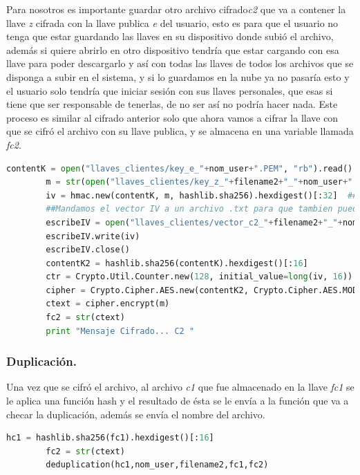 Para nosotros es importante guardar otro archivo cifrado\textit{c2} que va a contener la llave \textit{z} cifrada con la llave publica \textit{e} del usuario, esto es para que el usuario no tenga que estar guardando las llaves en su dispositivo donde subió el archivo, además si quiere abrirlo en otro dispositivo tendría que estar cargando con esa llave para poder descargarlo y así con todas las llaves de todos los archivos que se disponga a subir en el sistema, y si lo guardamos en la nube ya no pasaría esto y el usuario solo tendría que iniciar sesión con sus llaves personales, que esas si tiene que ser responsable de tenerlas, de no ser así no podría hacer nada. Este proceso es similar al cifrado anterior solo que ahora vamos a cifrar la llave con que se cifró el archivo con su llave publica, y se almacena en una variable llamada \textit{fc2}.

\begin{lstlisting}[language=Python,frame=single, keywordstyle=\color{blue},breaklines=true, showstringspaces=false]
        contentK = open("llaves_clientes/key_e_"+nom_user+".PEM", "rb").read()
        m = str(open("llaves_clientes/key_z_"+filename2+"_"+nom_user+".PEM", "rb").read())
        iv = hmac.new(contentK, m, hashlib.sha256).hexdigest()[:32]  ## Generacion del IV
        ##Mandamos el vector IV a un archivo .txt para que tambien pueda ser utilizado por el descifrado
        escribeIV = open("llaves_clientes/vector_c2_"+filename2+"_"+nom_user+".txt","wb")
        escribeIV.write(iv)
        escribeIV.close()
        contentK2 = hashlib.sha256(contentK).hexdigest()[:16]
        ctr = Crypto.Util.Counter.new(128, initial_value=long(iv, 16))
        cipher = Crypto.Cipher.AES.new(contentK2, Crypto.Cipher.AES.MODE_CTR, counter=ctr)
        ctext = cipher.encrypt(m)
        fc2 = str(ctext)
        print "Mensaje Cifrado... C2 "
\end{lstlisting}

\subsubsection{Duplicación.} 
Una vez que se cifró el archivo, al archivo \textit{c1} que fue almacenado en la llave \textit{fc1} se le aplica una función hash y el resultado de ésta se le envía a la función que va a checar la duplicación, además se envía el nombre del archivo.

\begin{lstlisting}[language=Python,frame=single, keywordstyle=\color{blue},breaklines=true, showstringspaces=false]
        hc1 = hashlib.sha256(fc1).hexdigest()[:16]
        fc2 = str(ctext)
        deduplication(hc1,nom_user,filename2,fc1,fc2)
\end{lstlisting}

